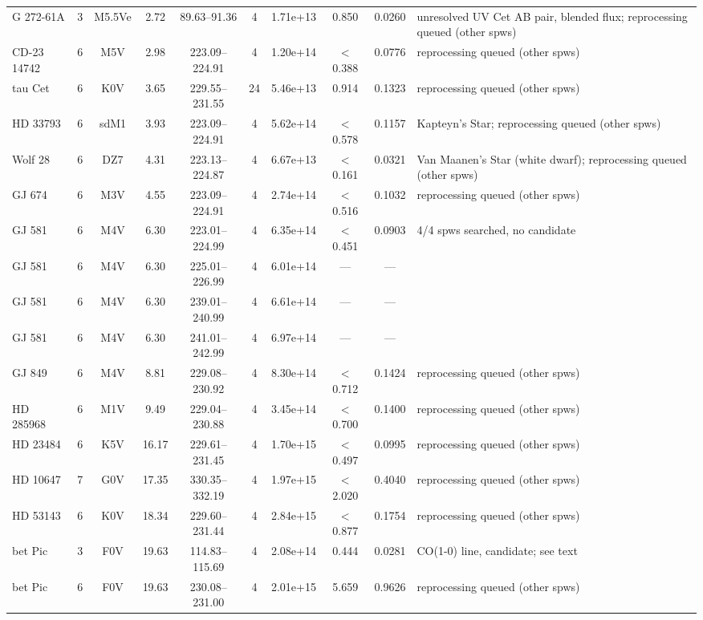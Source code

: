 \documentclass{openjournal}
\begin{document}
\begin{table}
\begin{tabularx}{\textwidth}{@{}l c c c c c c c c X@{}}
G 272-61A & 3 & M5.5Ve & 2.72 & 89.63--91.36 & 4 & 1.71e+13 & 0.850 & 0.0260 & unresolved UV Cet AB pair, blended flux; reprocessing queued (other spws) \\
CD-23 14742 & 6 & M5V & 2.98 & 223.09--224.91 & 4 & 1.20e+14 & $<$0.388 & 0.0776 & reprocessing queued (other spws) \\
tau Cet & 6 & K0V & 3.65 & 229.55--231.55 & 24 & 5.46e+13 & 0.914 & 0.1323 & reprocessing queued (other spws) \\
HD 33793 & 6 & sdM1 & 3.93 & 223.09--224.91 & 4 & 5.62e+14 & $<$0.578 & 0.1157 & Kapteyn's Star; reprocessing queued (other spws) \\
Wolf   28 & 6 & DZ7 & 4.31 & 223.13--224.87 & 4 & 6.67e+13 & $<$0.161 & 0.0321 & Van Maanen's Star (white dwarf); reprocessing queued (other spws) \\
GJ 674 & 6 & M3V & 4.55 & 223.09--224.91 & 4 & 2.74e+14 & $<$0.516 & 0.1032 & reprocessing queued (other spws) \\
GJ 581 & 6 & M4V & 6.30 & 223.01--224.99 & 4 & 6.35e+14 & $<$0.451 & 0.0903 & 4/4 spws searched, no candidate \\
GJ 581 & 6 & M4V & 6.30 & 225.01--226.99 & 4 & 6.01e+14 & --- & --- & \\
GJ 581 & 6 & M4V & 6.30 & 239.01--240.99 & 4 & 6.61e+14 & --- & --- & \\
GJ 581 & 6 & M4V & 6.30 & 241.01--242.99 & 4 & 6.97e+14 & --- & --- & \\
GJ 849 & 6 & M4V & 8.81 & 229.08--230.92 & 4 & 8.30e+14 & $<$0.712 & 0.1424 & reprocessing queued (other spws) \\
HD 285968 & 6 & M1V & 9.49 & 229.04--230.88 & 4 & 3.45e+14 & $<$0.700 & 0.1400 & reprocessing queued (other spws) \\
HD 23484 & 6 & K5V & 16.17 & 229.61--231.45 & 4 & 1.70e+15 & $<$0.497 & 0.0995 & reprocessing queued (other spws) \\
HD 10647 & 7 & G0V & 17.35 & 330.35--332.19 & 4 & 1.97e+15 & $<$2.020 & 0.4040 & reprocessing queued (other spws) \\
HD 53143 & 6 & K0V & 18.34 & 229.60--231.44 & 4 & 2.84e+15 & $<$0.877 & 0.1754 & reprocessing queued (other spws) \\
bet Pic & 3 & F0V & 19.63 & 114.83--115.69 & 4 & 2.08e+14 & 0.444 & 0.0281 & CO(1-0) line, candidate; see text \\
bet Pic & 6 & F0V & 19.63 & 230.08--231.00 & 4 & 2.01e+15 & 5.659 & 0.9626 & reprocessing queued (other spws) \\
\hline
\end{tabularx}
\end{table}
\end{document}
